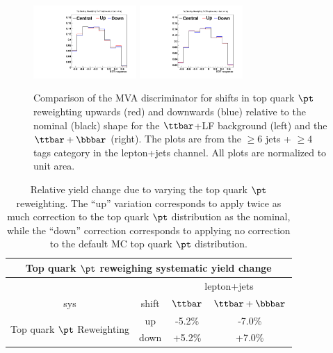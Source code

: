 \begin{description}
\begin{figure}[hbtp]
 \begin{center}
   \includegraphics[width=0.35\textwidth]{Figures/Analysis_2_Diagrams/SystPlot_CMS_ttH_topPtcorr_ttbar_ljets_jge6_tge4}
   \includegraphics[width=0.35\textwidth]{Figures/Analysis_2_Diagrams/SystPlot_CMS_ttH_topPtcorr_ttbarPlusBBbar_ljets_jge6_tge4}
  \caption{Comparison of the MVA discriminator for shifts in top quark $\pt$ reweighting upwards
     (red) and downwards (blue) relative to the nominal (black) shape
     for the $\ttbar$+LF background (left) and the $\ttbar + \bbbar$
     (right).  The plots are from the $\geq 6$ jets + $\geq 4$ tags category in the
     lepton+jets channel.  All plots are normalized to unit area.}   
\label{fig:topPtRwghtSyst}
\end{center}
\end{figure}

\begin{table}[hbtp] 
  \centering 
   \begin{tabular}{|c|c|c|c|} \hline 
\multicolumn{4}{|c|}{Top quark $\pt$ reweighing systematic yield change} \\ \hline
\multicolumn{2}{|c}{ } & \multicolumn{2}{|c|}{lepton+jets} \\ \hline
sys & shift & $\ttbar$ & $\ttbar+\bbbar$ \\ \hline 
\multirow{2}{*}{Top quark $\pt$ Reweighting} & up   & -5.2\% & -7.0\% \\
                                             & down & +5.2\% & +7.0\% \\ \hline
  \end{tabular} 
  \caption{Relative yield change due to varying the top quark $\pt$ reweighting.  The ``up'' variation corresponds to apply twice as much correction to the top quark $\pt$ distribution as the nominal, while the ``down'' correction corresponds to applying no correction to the default MC top quark $\pt$ distribution.}
  \label{tab:topPtRwghtSyst}
\end{table} 



\end{description}
